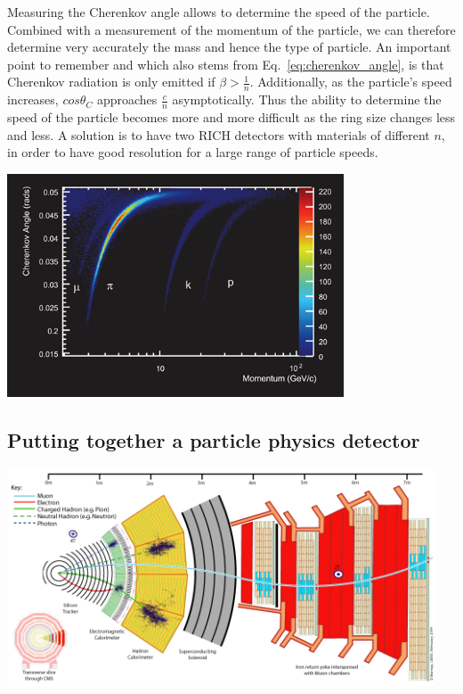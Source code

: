 Measuring the Cherenkov angle allows to determine the speed of the particle. Combined with a measurement of the momentum of the particle, we can therefore determine very accurately the mass and hence the type of particle. An important point to remember and which also stems from Eq.~\ref{eq:cherenkov_angle}, is that Cherenkov radiation is only emitted if $\beta>\frac{1}{n}$. Additionally, as the particle's speed increases, $cos\theta_{C}$ approaches $\frac{c}{n}$ asymptotically. Thus the ability to determine the speed of the particle becomes more and more difficult as the ring size changes less and less. A solution is to have two RICH detectors with materials of different $n$, in order to have good resolution for a large range of particle speeds.
\begin{center}
\includegraphics[width=0.75\textwidth]{fig/detector/lhcb_cherenkov_vs_momentum.png}
\end{center}




\subsection{Putting together a particle physics detector}
\label{sec:detectorSummary}
\begin{center}
\includegraphics[width=0.95\textwidth]{fig/detector/cms_slice.png}
\end{center}

